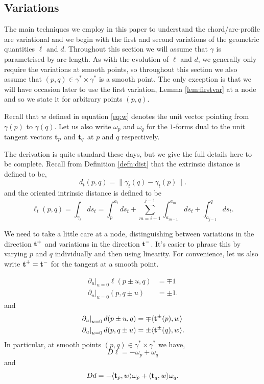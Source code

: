 \documentclass[11pt]{amsart}
\begin{document}
\subsection{Variations}
\label{sec:orgheadline8}

The main techniques we employ in this paper to understand the chord/arc-profile are variational and we begin with the first and second variations of the geometric quantities \(\ell\) and \(d\). Throughout this section we will assume that \(\gamma\) is parametrised by arc-length. As with the evolution of \(\ell\) and \(d\), we generally only require the variations at smooth points, so throughout this section we also assume that \((p,q) \in \gamma^{\ast} \times \gamma^{\ast}\) is a smooth point. The only exception is that we will have occasion later to use the first variation, Lemma \ref{lem:firstvar} at a node and so we state it for arbitrary points \((p,q)\).

Recall that \(w\) defined in equation \eqref{eq:w} denotes the unit vector pointing from \(\gamma(p)\) to \(\gamma(q)\). Let us also write $\omega_p$ and $\omega_q$ for the $1$-forms dual to the unit tangent vectors $\operatorname{\mathbf{t}}_p$ and $\operatorname{\mathbf{t}}_q$ at $p$ and $q$ respectively.

The derivation is quite standard these days, but we give the full details here to be complete. Recall from Definition \ref{defn:dist} that the extrinsic distance is defined to be,
\[
d_t(p, q) = \|\gamma_t(q) - \gamma_t(p)\|.
\]
and the oriented intrinsic distance is defined to be
\[
\ell_t(p, q) = \int_{\gamma_t} ds_t = \int_p^{a_i} ds_t + \sum_{m=i+1}^{j-1} \int_{a_{m-1}}^{a_m} ds_t + \int_{a_{j-1}}^q ds_t.
\]

We need to take a little care at a node, distinguishing between variations in the direction \(\operatorname{\mathbf{t}}^+\) and variations in the direction \(\operatorname{\mathbf{t}}^-\). It's easier to phrase this by varying \(p\) and \(q\) individually and then using linearity. For convenience, let us also write \(\operatorname{\mathbf{t}}^+ = \operatorname{\mathbf{t}}^-\) for the tangent at a smooth point.

\begin{lemma}
\label{lem:firstvar}
\[
\begin{split}
\left.\partial_u\right|_{u=0} \ell (p \pm u, q)  &= \mp 1 \\
\left.\partial_u\right|_{u=0} (p, q \pm u) &= \pm 1.
\end{split}
\]
and
\[
\begin{split}
\left.\partial_u\right|_{u=0} d (p \pm u, q) &= \mp \langle{\operatorname{\mathbf{t}}^{\pm}(p)},{w}\rangle \\
\left.\partial_u\right|_{u=0} d (p, q \pm u) &= \pm \langle{\operatorname{\mathbf{t}}^{\pm}(q)},{w}\rangle.
\end{split}
\]
In particular, at smooth points \((p,q) \in \gamma^{\ast} \times \gamma^{\ast}\) we have,
\[
D\ell = -\omega_p + \omega_q
\]
and
\[
D d = -\langle{\operatorname{\mathbf{t}}_p},{w}\rangle \omega_p + \langle{\operatorname{\mathbf{t}}_q},{w}\rangle \omega_q.
\]
\end{lemma}
\end{document}
